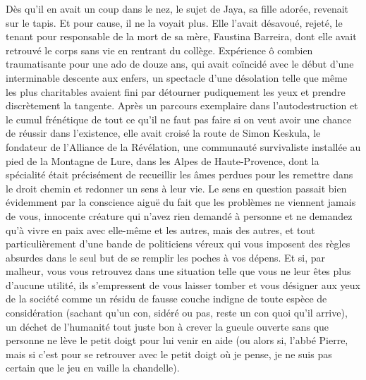 Dès qu’il en avait un coup dans le nez, le sujet de Jaya, sa fille adorée, revenait sur le tapis. Et pour cause, il ne la voyait plus. Elle l’avait désavoué, rejeté, le tenant pour responsable de la mort de sa mère, Faustina Barreira, dont elle avait retrouvé le corps sans vie en rentrant du collège. Expérience ô combien traumatisante pour une ado de douze ans, qui avait coïncidé avec le début d’une interminable descente aux enfers, un spectacle d’une désolation telle que même les plus charitables avaient fini par détourner pudiquement les yeux et prendre discrètement la tangente. Après un parcours exemplaire dans l’autodestruction et le cumul frénétique de tout ce qu’il ne faut pas faire si on veut avoir une chance de réussir dans l’existence, elle avait croisé la route de Simon Keskula, le fondateur de l’Alliance de la Révélation, une communauté survivaliste installée au pied de la Montagne de Lure, dans les Alpes de Haute-Provence, dont la spécialité était précisément de recueillir les âmes perdues pour les remettre dans le droit chemin et redonner un sens à leur vie. Le sens en question passait bien évidemment par la conscience aiguë du fait que les problèmes ne viennent jamais de vous, innocente créature qui n’avez rien demandé à personne et ne demandez qu’à vivre en paix avec elle-même et les autres, mais des autres, et tout particulièrement d’une bande de politiciens véreux qui vous imposent des règles absurdes dans le seul but de se remplir les poches à vos dépens. Et si, par malheur, vous vous retrouvez dans une situation telle que vous ne leur êtes plus d’aucune utilité, ils s’empressent de vous laisser tomber et vous désigner aux yeux de la société comme un résidu de fausse couche indigne de toute espèce de considération (sachant qu’un con, sidéré ou pas, reste un con quoi qu’il arrive), un déchet de l’humanité tout juste bon à crever la gueule ouverte sans que personne ne lève le petit doigt pour lui venir en aide (ou alors si, l’abbé Pierre, mais si c’est pour se retrouver avec le petit doigt où je pense, je ne suis pas certain que le jeu en vaille la chandelle).

